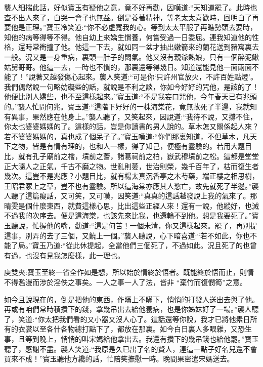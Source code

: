 \begin{parag}
    襲人細揣此話，好似寶玉有疑他之意，竟不好再勸，因嘆道:“天知道罷了。此時也查不出人來了，白哭一會子也無益。倒是養著精神，等老太太喜歡時，回明白了再要他是正理。”寶玉冷笑道:“你不必虛寬我的心。等到太太平服了再瞧勢頭去要時，知他的病等得等不得。他自幼上來嬌生慣養，何嘗受過一日委屈。連我知道他的性格，還時常衝撞了他。他這一下去，就如同一盆才抽出嫩箭來的蘭花送到豬窩裏去一般。況又是一身重病，裏頭一肚子的悶氣。他又沒有親爺熱娘，只有一個醉泥鰍姑舅哥哥。他這一去，一時也不慣的，那裏還等得幾日。知道還能見他一面兩面不能了！”說著又越發傷心起來。襲人笑道:“可是你‘只許州官放火，不許百姓點燈’。我們偶然說一句略妨礙些的話，就說是不利之談，你如今好好的咒他，是該的了！他便比別人嬌些，也不至這樣起來。”寶玉道:“不是我妄口咒他，今年春天已有兆頭的。”襲人忙問何兆。寶玉道:“這階下好好的一株海棠花，竟無故死了半邊，我就知有異事，果然應在他身上。”襲人聽了，又笑起來，因說道:“我待不說，又撐不住，你太也婆婆媽媽的了。這樣的話，豈是你讀書的男人說的。草木怎又關係起人來？若不婆婆媽媽的，真也成了個呆子了。”寶玉嘆道:“你們那裏知道，不但草木，凡天下之物，皆是有情有理的，也和人一樣，得了知己，便極有靈驗的。若用大題目比，就有孔子廟前之檜，墳前之蓍，諸葛祠前之柏，嶽武穆墳前之松。這都是堂堂正大隨人之正氣，千古不磨之物。世亂則萎，世治則榮，幾千百年了，枯而復生者幾次。這豈不是兆應？小題目比，就有楊太真沉香亭之木芍藥，端正樓之相思樹，王昭君冢上之草，豈不也有靈驗。所以這海棠亦應其人慾亡，故先就死了半邊。”襲人聽了這篇癡話，又可笑，又可嘆，因笑道:“真真的這話越發說上我的氣來了。那晴雯是個什麼東西，就費這樣心思，比出這些正經人來！還有一說，他縱好，也滅不過我的次序去。便是這海棠，也該先來比我，也還輪不到他。想是我要死了。”寶玉聽說，忙握他的嘴，勸道:“這是何苦！一個未清，你又這樣起來。罷了，再別提這事，別弄的去了三個，又饒上一個。”襲人聽說，心下暗喜道:“若不如此，你也不能了局。”寶玉乃道:“從此休提起，全當他們三個死了，不過如此。況且死了的也曾有過，也沒有見我怎麼樣，此一理也。\begin{note}庚雙夾:寶玉至終一省全作如是想，所以始於情終於悟者。既能終於悟而止，則情不得濫漫而涉於淫佚之事矣。一人之事一人了法，皆非 “棄竹而復憫筍”之意。\end{note}如今且說現在的，倒是把他的東西，作瞞上不瞞下，悄悄的打發人送出去與了他。再或有咱們常時積攢下的錢，拿幾吊出去給他養病，也是你姊妹好了一場。”襲人聽了，笑道:“你太把我們看的又小器又沒人心了。這話還等你說，我才已將他素日所有的衣裳以至各什各物總打點下了，都放在那裏。如今白日裏人多眼雜，又恐生事，且等到晚上，悄悄的叫宋媽給他拿出去。我還有攢下的幾吊錢也給他罷。”寶玉聽了，感謝不盡。襲人笑道:“我原是久已出了名的賢人，連這一點子好名兒還不會買來不成！”寶玉聽他方纔的話，忙陪笑撫慰一時。晚間果密遣宋媽送去。
\end{parag}


